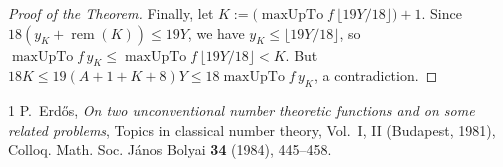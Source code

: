 \documentclass[11pt,a4paper]{amsart}
\newcommand{\maxUpTo}{\operatorname{maxUpTo}}
\newcommand{\rem}{\operatorname{rem}}
\begin{document}
\begin{proof}[Proof of the Theorem]
Finally, let $K := \bigl(\maxUpTo f\, \lfloor 19 Y / 18 \rfloor\bigr) + 1$. Since $18(y_K + \rem(K)) \le 19 Y$, we have $y_K \le \lfloor 19 Y / 18 \rfloor$, so $\maxUpTo f\, y_K \le \maxUpTo f\, \lfloor 19 Y / 18 \rfloor < K$. But $18 K \le 19(A + 1 + K + 8) Y \le 18 \maxUpTo f\, y_K$, a contradiction.
\end{proof}

\begin{thebibliography}{1}
P.~Erd\H{o}s, \emph{On two unconventional number theoretic functions and on some related problems}, Topics in classical number theory, Vol.~I, II (Budapest, 1981), Colloq. Math. Soc. J\'anos Bolyai \textbf{34} (1984), 445--458.
\end{thebibliography}
\end{document}
